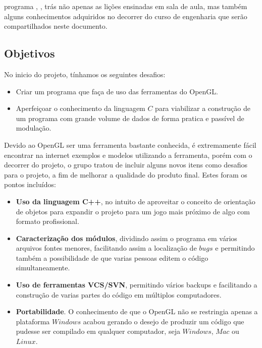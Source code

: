 ﻿%



%
%

 programa , \assunto, trás não apenas as lições ensinadas em sala de aula, mas também alguns conhecimentos adquiridos no decorrer do curso de engenharia que serão compartilhados neste documento.



\subsection{Objetivos}\label{obj}


No inicio do projeto, tínhamos os seguintes desafios:

\begin{itemize}
	\item Criar um programa que faça de uso das ferramentas do OpenGL.
	\item Aperfeiçoar o conhecimento da linguagem $C$ para viabilizar a construção de um programa com grande volume de dados de forma pratica e passível de modulação.
\end{itemize}

Devido ao OpenGL ser uma ferramenta bastante conhecida, é extremamente fácil encontrar na internet exemplos e modelos utilizando a ferramenta, porém com o decorrer do projeto, o grupo tratou de incluir alguns novos itens como desafios para o projeto, a fim de melhorar a qualidade do produto final. Estes foram os pontos incluídos:

\begin{itemize}
	\item \textbf{Uso da linguagem C++}, no intuito de aproveitar o conceito de orientação de objetos para expandir o projeto para um jogo mais próximo de algo com formato profissional.
	\item \textbf{Caracterização dos módulos}, dividindo assim o programa em vários arquivos fontes menores, facilitando assim a localização de $bugs$ e permitindo também a possibilidade de que varias pessoas editem o código simultaneamente.
	\item \textbf{Uso de ferramentas VCS/SVN}, permitindo vários backups e facilitando a construção de varias partes do código em múltiplos computadores.
	\item \textbf{Portabilidade}. O conhecimento de que o OpenGL não se restringia apenas a plataforma $Windows$ acabou gerando o desejo de produzir um código que pudesse ser compilado em qualquer computador, seja $Windows$, $Mac$ ou $Linux$.
\end{itemize}

